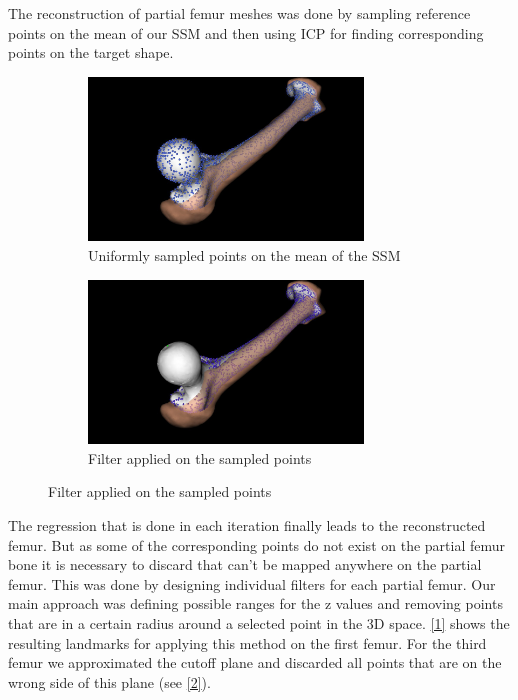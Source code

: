 \documentclass{article}
\begin{document}
	The reconstruction of partial femur meshes was done by sampling reference points on the mean of our SSM and then using ICP for finding corresponding points on the target shape. \\
	\begin{figure}
		\begin{subfigure}{.5\textwidth}
		\centering
		\includegraphics[width=7.3cm]{1.jpg}
		\caption{Uniformly sampled points on the mean of the SSM}
	\end{subfigure}	
	\begin{subfigure}{.5\textwidth}
		\centering
		 \includegraphics[width=7.3cm]{2.jpg}
		\caption{Filter applied on the sampled points}
	\end{subfigure}	
	\label{1}
	\end{figure}

	
	
	The regression that is done in each iteration finally leads to the reconstructed femur. But as some of the corresponding points do not exist on the partial femur bone it is necessary to discard that can’t be mapped anywhere on the partial femur. This was done by designing individual filters for each partial femur. 
	Our main approach was defining possible ranges for the z values and removing points that are in a certain radius around a selected point in the 3D space. \autoref{1} shows the resulting landmarks for applying this method on the first femur. For the third femur we approximated the cutoff plane and discarded all points that are on the wrong side of this plane (see \autoref{2}).\\
	
\end{document}
